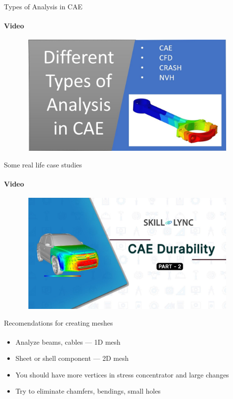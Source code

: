 \documentclass[aspectratio=169]{beamer}
\begin{document}
\begin{frame}[t]{Types of Analysis in CAE}
    \framesubtitle{Video}
    \vspace{-0.6cm}
    \begin{figure}[H]
        \href{https://youtu.be/LyIHUFzO9kE}{
            \centering\includegraphics[height=6cm,width=1\textwidth,keepaspectratio]{types_of_analysis_in_cae_video.jpg}}
        \label{fig:types_of_analysis_in_cae_video.jpg}
    \end{figure}
\end{frame}

\begin{frame}[t]{Some real life case studies}
    \framesubtitle{Video}
    \vspace{-0.6cm}
    \begin{figure}[H]
        \href{https://youtu.be/BkTJ-PdliC4?t=374}{
            \centering\includegraphics[height=6cm,width=1\textwidth,keepaspectratio]{cae_durability_video.jpg}}
        \label{fig:cae_durability_video.jpg}
    \end{figure}
\end{frame}

\begin{frame}[t]{Recomendations for creating meshes}
\framesubtitle{}
    \begin{itemize}
        \item Analyze beams, cables --- 1D mesh
        \item Sheet or shell component --- 2D mesh
        \item You should have more vertices in stress concentrator and large changes
        \item Try to eliminate chamfers, bendings, small holes
    \end{itemize}
\end{frame}
\end{document}
